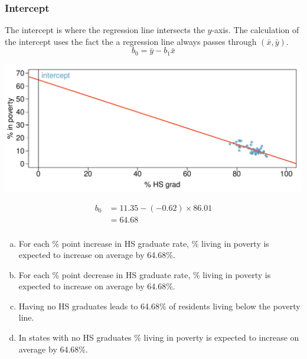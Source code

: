 
\begin{frame}
\frametitle{Intercept}

{The intercept is where the regression line intersects the $y$-axis. The calculation of the intercept uses the fact the a regression line always passes through $(\bar{x},\bar{y})$.
\[ b_0 = \bar{y} - b_1 \bar{x} \]
}

\pause

{
\begin{center}
\includegraphics[width=\textwidth]{7-2_least_square_reg/figures/poverty/poverty_hsgrad_line_wide}
\end{center}
}
{
\pause
\begin{align*}
b_0 &= 11.35 - (-0.62) \times 86.01 \\
&= 64.68
\end{align*}
}

\end{frame}


\begin{frame}
\frametitle{}


\begin{enumerate}[(a)]
\item For each \% point increase in HS graduate rate, \% living in poverty is expected to increase on average by 64.68\%.
\item For each \% point decrease in HS graduate rate, \% living in poverty is expected to increase on average by 64.68\%.
\item Having no HS graduates leads to 64.68\% of residents living below the poverty line.
\item In states with no HS graduates \% living in poverty is expected to increase on average by 64.68\%.
\end{enumerate}

\end{frame}

